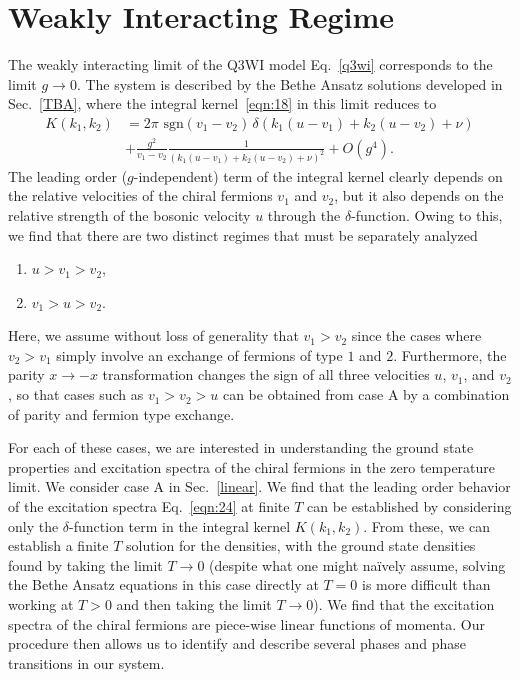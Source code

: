 \documentclass[aps,pra,
superscriptaddress,
reprint,twocolumn,preprintnumbers,
amsmath,amssymb,
nofootinbib]{revtex4-1}
\begin{document}
		\section{Weakly Interacting Regime}
		\label{weakint}

The weakly interacting limit of the Q3WI model Eq.~\eqref{q3wi} corresponds to the limit $g \to 0$. The system is described by the Bethe Ansatz solutions developed in Sec.~\ref{TBA}, where the integral kernel~\eqref{eqn:18} in this limit reduces to  
        \begin{align}
        \label{eqn:43}
        K(k_1,k_2) & = 2 \pi \text{ sgn}(v_1 - v_2)\,\delta\left(k_1(u - v_1) + k_2(u - v_2) + \nu\right) \nonumber \\ &+ \frac{g^2}{v_1 - v_2}\frac{1}{\left(k_1(u - v_1) + k_2(u - v_2) + \nu\right)^2} + O(g^4).
        \end{align}
The leading order ($g$-independent) term of the integral kernel clearly depends on the relative velocities of the chiral fermions $v_1$ and $v_2$, but it also depends on the relative strength of the bosonic velocity $u$ through the $\delta$-function. Owing to this, we find that there are two distinct regimes that must be separately analyzed 
		\begin{enumerate}[{A.}]
    	\item $u > v_1 > v_2$,
    	\item $v_1 > u > v_2$.
		\end{enumerate}
Here, we assume without loss of generality that $v_1>v_2$ since the cases where $v_2>v_1$ simply involve an exchange of fermions of type $1$ and $2$. Furthermore, the parity $x \rightarrow -x$ transformation changes the sign of all three velocities $u$, $v_1$, and $v_2$, so that cases such as $v_1>v_2>u$ can be obtained from case A by a combination of parity and fermion type exchange.

For each of these cases, we are interested in understanding the ground state properties and excitation spectra of the chiral fermions in the zero temperature limit. We consider case A in Sec.~\ref{linear}. We find that the leading order behavior of the excitation spectra Eq.~\eqref{eqn:24} at finite $T$ can be established by considering only the $\delta$-function term in the integral kernel $K(k_1,k_2)$. From these, we can establish a finite $T$ solution for the densities, with the ground state densities found by taking the limit $T \to 0$ (despite what one might na\"ively assume, solving the Bethe Ansatz equations in this case directly at $T=0$ is more difficult than working at $T>0$ and then taking the limit $T \rightarrow 0$). We find that the excitation spectra of the chiral fermions are piece-wise linear functions of momenta. Our procedure then allows us to identify and describe several phases and phase transitions in our system.
\end{document}
